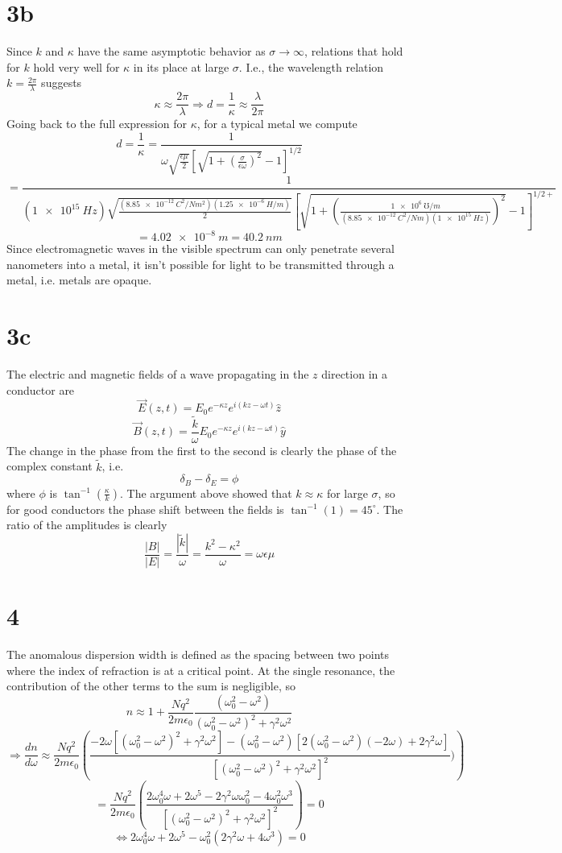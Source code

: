 \documentclass{article}
\begin{document}
\section*{3b}
Since $k$ and $\kappa$ have the same asymptotic behavior as $\sigma\to\infty$, relations that hold for $k$ hold very well for $\kappa$ in its place at large $\sigma$. I.e., the wavelength relation $k=\frac{2\pi}{\lambda}$ suggests
\[\kappa\approx \frac{2\pi}{\lambda}\Rightarrow d=\frac{1}{\kappa}\approx\frac{\lambda}{2\pi}\]
Going back to the full expression for $\kappa$, for a typical metal we compute
\[d=\frac{1}{\kappa}=\frac{1}{\omega\sqrt{\frac{\epsilon\mu}{2}}\left[ \sqrt{1+\left( \frac{\sigma}{\epsilon\omega} \right)^{2}}-1 \right]^{1/2}}\]
\[=\frac{1}{(\SI{1e15}{Hz})\sqrt{\frac{(\SI{8.85e-12}{C^{2}/Nm^{2}})(\SI{1.25e-6}{H/m})}{2}}\left[ \sqrt{1+\left( \frac{\SI{1e6}{\mho/m}}{(\SI{8.85e-12}{C^{2}/Nm})(\SI{1e15}{Hz})} \right)^{2}}-1 \right]^{1/2+}}\]
\[=\SI{4.02e-8}{m}=\SI{40.2}{nm}\]
Since electromagnetic waves in the visible spectrum can only penetrate several nanometers into a metal, it isn't possible for light to be transmitted through a metal, i.e. metals are opaque.

\section*{3c}
The electric and magnetic fields of a wave propagating in the $z$ direction in a conductor are
\[\vec{E}(z,t)=E_{0}e^{-\kappa z}e^{i(kz-\omega t)}\hat{z}\]
\[\vec{B}(z,t)=\frac{\tilde{k}}{\omega}E_{0}e^{-\kappa z}e^{i(kz-\omega t)}\hat{y}\]
The change in the phase from the first to the second is clearly the phase of the complex constant $\tilde{k}$, i.e.
\[\delta_{B}-\delta_{E}=\phi\]
where $\phi$ is $\tan^{-1}\left( \frac{\kappa}{k} \right)$.
The argument above showed that $k\approx \kappa$ for large $\sigma$, so for good conductors the phase shift between the fields is $\tan^{-1}(1)=45^{\circ}$.
The ratio of the amplitudes is clearly
\[\frac{|B|}{|E|}=\frac{|\tilde{k}|}{\omega}=\frac{k^{2}-\kappa^{2}}{\omega}={\omega\epsilon\mu}\]

\section*{4}
The anomalous dispersion width is defined as the spacing between two points where the index of refraction is at a critical point. At the single resonance, the contribution of the other terms to the sum is negligible, so
\[n\approx1+\frac{Nq^{2}}{2m\epsilon_{0}}\frac{(\omega_{0}^{2}-\omega^{2})}{\left(\omega_{0}^{2}-\omega^{2}\right)^{2}+\gamma^{2}\omega^{2}}\]
\[\Rightarrow \frac{dn}{d\omega}\approx\frac{Nq^{2}}{2m\epsilon_{0}}\left( \frac{-2\omega[(\omega_{0}^{2}-\omega^{2})^{2}+\gamma^{2}\omega^{2}]-(\omega_{0}^{2}-\omega^{2})[2(\omega_{0}^{2}-\omega^{2})(-2\omega)+2\gamma^{2}\omega]}{[(\omega_{0}^{2}-\omega^{2})^{2}+\gamma^{2}\omega^{2}]^{2}}) \right)\]
\[=\frac{Nq^{2}}{2m\epsilon_{0}}\left( \frac{2\omega_{0}^{4}\omega+2\omega^{5}-2\gamma^{2}\omega\omega_{0}^{2}-4\omega_{0}^{2}\omega^{3}}{[(\omega_{0}^{2}-\omega^{2})^{2}+\gamma^{2}\omega^{2}]^{2}} \right)=0\]
\[\Leftrightarrow 2\omega_{0}^{4}\omega+2\omega^{5}-\omega_{0}^{2}(2\gamma^{2}\omega+4\omega^{3})=0\]
\end{document}
